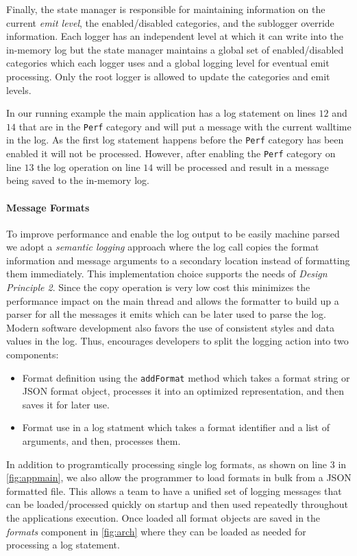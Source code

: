 Finally, the state manager is responsible for maintaining information on the current 
\emph{emit level}, the enabled/disabled categories, and the sublogger override information. 
Each logger has an independent level at which it can write into the in-memory log but 
the state manager maintains a global set of enabled/disabled categories which each logger 
uses and a global logging level for eventual emit processing. Only the root logger is 
allowed to update the categories and emit levels. 

In our running example the main application has a log statement on lines $12$ and $14$ 
that are in the \texttt{Perf} category and will put a message with the current walltime 
in the log. As the first log statement happens before the \texttt{Perf} category has 
been enabled it will not be processed. However, after enabling the \texttt{Perf} category 
on line $13$ the log operation on line $14$ will be processed and result in a message 
being saved to the in-memory log.

\paragraph{Message Formats}
\noindent
To improve performance and enable the log output to be easily machine parsed we 
adopt a \emph{semantic logging} approach where the log call copies the format 
information and message arguments to a secondary location instead of formatting them 
immediately. This implementation choice supports the needs of \emph{Design Principle 2}.
Since the copy operation is very low cost this minimizes the 
performance impact on the main thread and allows the formatter to build up a 
parser for all the messages it emits which can be later used to parse the log. 
Modern software development also favors the use of consistent styles and data 
values in the log. Thus, \projn encourages developers to split the logging 
action into two components:
\begin{itemize}
\item Format definition using the \texttt{addFormat} method which takes a format 
string or JSON format object, processes it into an optimized representation, 
and then saves it for later use.
\item Format use in a log statment which takes a format identifier and a list of 
arguments, and then, processes them.
\end{itemize}

In addition to programtically processing single log formats, as shown on line 3 
in \autoref{fig:appmain}, we also allow the programmer to load formats in bulk 
from a JSON formatted file. This allows a team to have a unified set of logging 
messages that can be loaded/processed quickly on startup and then used repeatedly 
throughout the applications execution. Once loaded all format objects are saved 
in the \emph{formats} component in \autoref{fig:arch} where they can be loaded 
as needed for processing a log statement.

